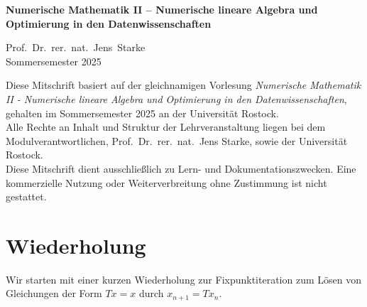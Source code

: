 \documentclass{article}
\begin{document}
\begin{titlepage}
    \centering
    \vspace*{3cm}
    \Large\textbf{Numerische Mathematik II -- Numerische lineare Algebra und Optimierung in den Datenwissenschaften}

    \vspace{1cm}
    \large
    Prof.\ Dr.\ rer.\ nat.\ Jens\ Starke
    \\
    Sommersemester 2025

    \vfill
\end{titlepage}

\tableofcontents
\newpage
\vspace*{2cm}
\begin{center}
    \begin{minipage}{0.85\textwidth}
        \small
        Diese Mitschrift basiert auf der gleichnamigen Vorlesung \textit{Numerische Mathematik II - 
        Numerische lineare Algebra und Optimierung in den Datenwissenschaften}, gehalten im Sommersemester 2025 
        an der Universität Rostock.\\[0.5em]
        Alle Rechte an Inhalt und Struktur der Lehrveranstaltung liegen bei dem Modulverantwortlichen, 
        Prof.\ Dr.\ rer.\ nat.\ Jens Starke, sowie der Universität Rostock.\\[0.5em]
        Diese Mitschrift dient ausschließlich zu Lern- und Dokumentationszwecken. Eine kommerzielle Nutzung oder 
        Weiterverbreitung ohne Zustimmung ist nicht gestattet.
    \end{minipage}
\end{center}

\section{Wiederholung}
Wir starten mit einer kurzen Wiederholung zur Fixpunktiteration zum Lösen von Gleichungen 
der Form $Tx=x$ durch $x_{n+1}=Tx_n$.
\end{document}
